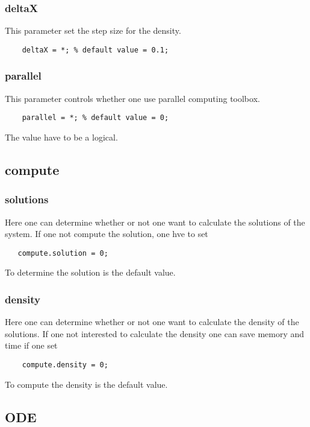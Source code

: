 \documentclass[12pt,a4paper]{article}
\begin{document}
\subsubsection*{deltaX}
This parameter set the step size for the density.

\begin{lstlisting}
	deltaX = *; % default value = 0.1;
\end{lstlisting}

\subsubsection*{parallel}
This parameter controls whether one use parallel computing toolbox.

\begin{lstlisting}
	parallel = *; % default value = 0;
\end{lstlisting}

The value have to be a logical. 

\subsection*{compute}
\subsubsection*{solutions}
Here one can determine whether or not one want to calculate the solutions of the system. If one not compute the solution, one hve to set 
\begin{lstlisting}
   compute.solution = 0;
\end{lstlisting}

To determine the solution is the default value.

\subsubsection*{density}
Here one can determine whether or not one want to calculate the density of the solutions. If one not interested to calculate the density one can save memory and time if one set 
\begin{lstlisting}
	compute.density = 0;
\end{lstlisting} 

To compute the density is the default value.

\subsection{ODE}
\end{document}
